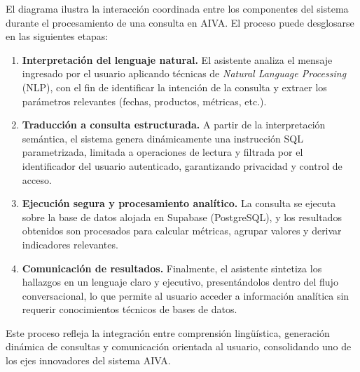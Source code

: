 El diagrama ilustra la interacción coordinada entre los componentes del sistema durante el procesamiento de una consulta en AIVA. El proceso puede desglosarse en las siguientes etapas:



\begin{enumerate}[label=\arabic*., leftmargin=*, nosep]

 \item \textbf{Interpretación del lenguaje natural.} El asistente analiza el mensaje ingresado por el usuario aplicando técnicas de \textit{Natural Language Processing} (NLP), con el fin de identificar la intención de la consulta y extraer los parámetros relevantes (fechas, productos, métricas, etc.).

\item \textbf{Traducción a consulta estructurada.} A partir de la interpretación semántica, el sistema genera dinámicamente una instrucción SQL parametrizada, limitada a operaciones de lectura y filtrada por el identificador del usuario autenticado, garantizando privacidad y control de acceso.

\item \textbf{Ejecución segura y procesamiento analítico.} La consulta se ejecuta sobre la base de datos alojada en Supabase (PostgreSQL), y los resultados obtenidos son procesados para calcular métricas, agrupar valores y derivar indicadores relevantes.

\item \textbf{Comunicación de resultados.} Finalmente, el asistente sintetiza los hallazgos en un lenguaje claro y ejecutivo, presentándolos dentro del flujo conversacional, lo que permite al usuario acceder a información analítica sin requerir conocimientos técnicos de bases de datos.

\end{enumerate}

Este proceso refleja la integración entre comprensión lingüística, generación dinámica de consultas y comunicación orientada al usuario, consolidando uno de los ejes innovadores del sistema AIVA.

